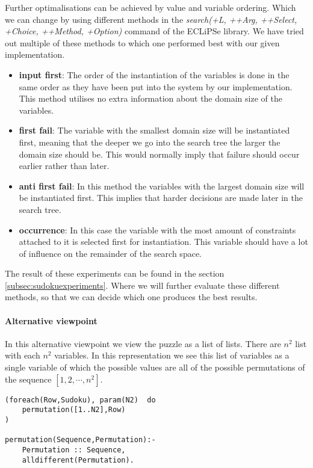 Further optimalisations can be achieved by value and variable ordering.
Which we can change by using different methods in the \textsl{search(+L, ++Arg, ++Select, +Choice, ++Method, +Option)} command of the ECLiPSe library. 
We have tried out multiple of these methods to which one performed best with our given implementation.
\begin{itemize}
\item \textbf{input first}: The order of the instantiation of the variables is done in the same order as they have been put into the system by our implementation. This method utilises no extra information about the domain size of the variables.
\item \textbf{first fail}: The variable with the smallest domain size will be instantiated first, meaning that the deeper we go into the search tree the larger the domain size should be. This would normally imply that failure should occur earlier rather than later. 
\item \textbf{anti first fail}: In this method the variables with the largest domain size will be instantiated first. This implies that harder decisions are made later in the search tree.
\item \textbf{occurrence}: In this case the variable with the most amount of constraints attached to it is selected first for instantiation. This variable should have a lot of influence on the remainder of the search space. 
\end{itemize}

The result of these experiments can be found in the section \ref{subsec:sudokuexperiments}.
Where we will further evaluate these different methods, so that we can decide which one produces the best results.

\paragraph*{Alternative viewpoint}

In this alternative viewpoint we view the puzzle as a list of lists.
There are $n^2$ list with each $n^{2}$ variables.
In this representation we see this list of variables as a single variable of which the possible values are all of the possible permutations of the sequence $[1,2,\cdots,n^{2}]$. \\

\begin{lstlisting}
(foreach(Row,Sudoku), param(N2)  do
	permutation([1..N2],Row)
)

permutation(Sequence,Permutation):-
	Permutation :: Sequence,
	alldifferent(Permutation).
\end{lstlisting}

